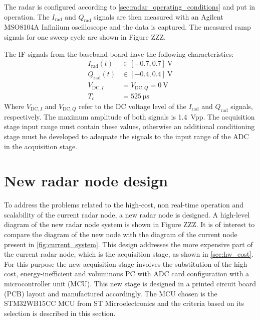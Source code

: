 The radar is configured according to \cref{sec:radar_operating_conditions} and put in operation. The $I_\mathrm{rad}$ and $Q_\mathrm{rad}$ signals are then measured with an Agilent MSO8104A Infiniium oscilloscope and the data is captured. The measured ramp signals for one sweep cycle are shown in Figure ZZZ.

The IF signals from the baseband board have the following characteristics:
\begin{align} \label{eqn:iq_volts}
	I_\mathrm{rad}(t) &\in [-0.7, 0.7]\ \si{\volt} \\
	Q_\mathrm{rad}(t) &\in [-0.4, 0.4]\ \si{\volt} \\
	V_{\mathrm{DC},I} &= V_{\mathrm{DC},Q} = \SI{0}{\volt} \\
	T_c &= \SI{525}{\micro\second}
\end{align}
Where $V_{\mathrm{DC},I}$ and $V_{\mathrm{DC},Q}$ refer to the DC voltage level of the $I_\mathrm{rad}$ and $Q_\mathrm{rad}$ signals, respectively. The maximum amplitude of both signals is \SI{1.4}{Vpp}. The acquisition stage input range must contain these values, otherwise an additional conditioning stage must be developed to adequate the signals to the input range of the ADC in the acquisition stage. 

\section{New radar node design} \label{sec:new_design}

To address the problems related to the high-cost, non real-time operation and scalability of the current radar node, a new radar node is designed. A high-level diagram of the new radar node system is shown in Figure ZZZ. It is of interest to compare the diagram of the new node with the diagram of the current node present in \cref{fig:current_system}. This design addresses the more expensive part of the current radar node, which is the acquisition stage, as shown in \cref{sec:hw_cost}. For this purpose the new acquisition stage involves the substitution of the high-cost, energy-inefficient and voluminous PC with ADC card configuration with a microcontroller unit (MCU). This new stage is designed in a printed circuit board (PCB) layout and manufactured accordingly. The MCU chosen is the STM32WB15CC MCU from ST Microelectronics \cite{STMicroelectronics2022} and the criteria based on its selection is described in this section.

